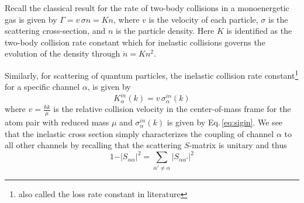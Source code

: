 Recall the classical result for the rate of two-body collisions in a monoenergetic gas is given by $\Gamma = v \,\sigma n = K n$, where $v$ is the velocity of each particle, $\sigma$ is the scattering cross-section, and $n$ is the particle density.
Here $K$ is identified as the two-body collision rate constant which for inelastic collisions governs the evolution of the density through $\dot{n} = K n^2$.

Similarly, for scattering of quantum particles, the inelastic collision rate constant\footnote{also called the loss rate constant in literature} for a specific channel $\alpha$, is given by \cite{Nicholson2015a}
\begin{equation} \label{eq:simpleK}
	K^{in}_{\alpha}(k) = v\,\sigma^{in}_{\alpha}(k)
\end{equation}
where $v=\frac{\hbar k}{\mu}$ is the relative collision velocity in the center-of-mass frame for the atom pair with reduced mass $\mu$ and $\sigma^{in}_{\alpha}(k)$ is given by Eq.\,\ref{eq:sigin}.
We see that the inelastic cross section simply characterizes the coupling of channel $\alpha$ to all other channels by recalling that the scattering $S$-matrix is unitary and thus
\begin{equation}
	1 - \vert S_{\alpha \alpha} \vert^2 = \sum_{\alpha' \neq \alpha}\vert S_{\alpha \alpha'} \vert^2
\end{equation}

